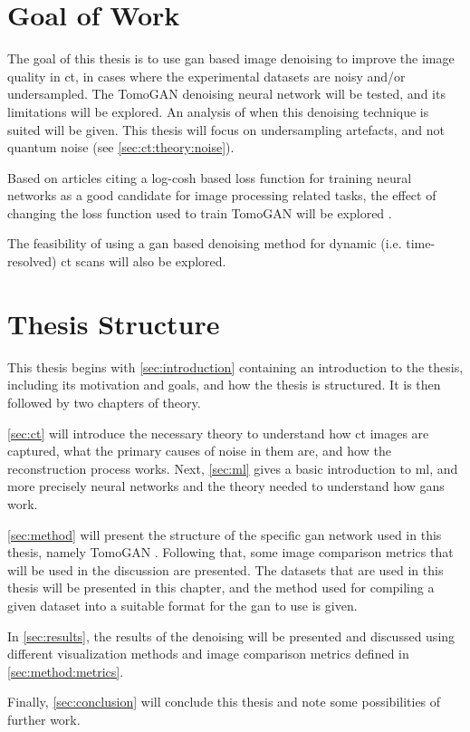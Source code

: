\section{Goal of Work}
The goal of this thesis is to use \gls{gan} based image denoising to improve the image quality in \gls{ct}, in cases where the experimental datasets are noisy and/or undersampled. The TomoGAN \cite{liu2020tomogan} denoising neural network will be tested, and its limitations will be explored. An analysis of when this denoising technique is suited will be given. This thesis will focus on undersampling artefacts, and not quantum noise (see \cref{sec:ct:theory:noise}). 

Based on articles citing a log-cosh based loss function for training neural networks as a good candidate for image processing related tasks, the effect of changing the loss function used to train TomoGAN will be explored \cite{chen2019log,7797130}. 

The feasibility of using a \gls{gan} based denoising method for dynamic (i.e. time-resolved) \gls{ct} scans will also be explored. 

\section{Thesis Structure}
This thesis begins with \cref{sec:introduction} containing an introduction to the thesis, including its motivation and goals, and how the thesis is structured. It is then followed by two chapters of theory. 

\cref{sec:ct} will introduce the necessary theory to understand how \gls{ct} images are captured, what the primary causes of noise in them are, and how the reconstruction process works. Next, \cref{sec:ml} gives a basic introduction to \gls{ml}, and more precisely neural networks and the theory needed to understand how \gls{gan}s work. 

\cref{sec:method} will present the structure of the specific \gls{gan} network used in this thesis, namely TomoGAN \cite{liu2020tomogan}. Following that, some image comparison metrics that will be used in the discussion are presented. The datasets that are used in this thesis will be presented in this chapter, and the method used for compiling a given dataset into a suitable format for the \gls{gan} to use is given. 

In \cref{sec:results}, the results of the denoising will be presented and discussed using different visualization methods and image comparison metrics defined in \cref{sec:method:metrics}.

Finally, \cref{sec:conclusion} will conclude this thesis and note some possibilities of further work. 
